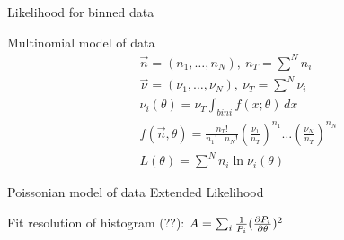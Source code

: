 \documentclass[asd-beamer.tex]{subfiles}
\begin{document}
\begin{frame}{Likelihood for binned data}
\begin{block}{Multinomial model of data}
\begin{align*}
&\vec{n}=(n_1,\ldots,n_N),\ n_T=\sum^Nn_i\\
&\vec{\nu}=(\nu_1,\ldots,\nu_N),\ \nu_T=\sum^N\nu_i\\
&\nu_i(\theta)=\nu_T\int_{bin i}f(x;\theta)\,dx\\
&f(\vec{n},\theta)=\frac{n_T!}{n_1!\ldots n_N!}(\frac{\nu_1}{n_T})^{n_1}\ldots(\frac{\nu_N}{n_T})^{n_N}\\
&L(\theta)=\sum^Nn_i\ln{\nu_i(\theta)}
\end{align*}
\end{block}
\begin{block}{Poissonian model of data}
Extended Likelihood
\end{block}

Fit resolution of histogram (??): $A=\sum_i\frac{1}{P_i}(\frac{\partial P_i}{\partial \theta})^2$
\end{frame}
\end{document}
